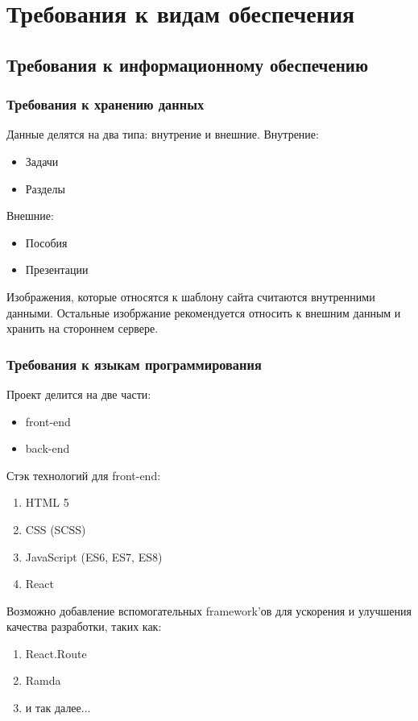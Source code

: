 \section{Требования к видам обеспечения}
\subsection{Требования к информационному обеспечению}
\subsubsection{Требования к хранению данных}
Данные делятся на два типа: внутрение и внешние.
Внутрение:
\begin{itemize}
    \item Задачи
    \item Разделы
\end{itemize}
Внешние:
\begin{itemize}
    \item Пособия
    \item Презентации
\end{itemize}

Изображения, которые относятся к шаблону сайта считаются внутренними данными. Остальные изобржание рекомендуется относить к внешним данным и хранить на стороннем сервере.
\subsubsection{Требования к языкам программирования}
Проект делится на две части:
\begin{itemize}
    \item front-end
    \item back-end
\end{itemize}
Стэк технологий для front-end:
\begin{enumerate}
    \item HTML 5
    \item CSS (SCSS)
    \item JavaScript (ES6, ES7, ES8)
    \item React
\end{enumerate}
Возможно добавление вспомогательных framework'ов для ускорения и улучшения качества разработки, таких как:
\begin{enumerate}
    \item React.Route
    \item Ramda
    \item и так далее...
\end{enumerate}
